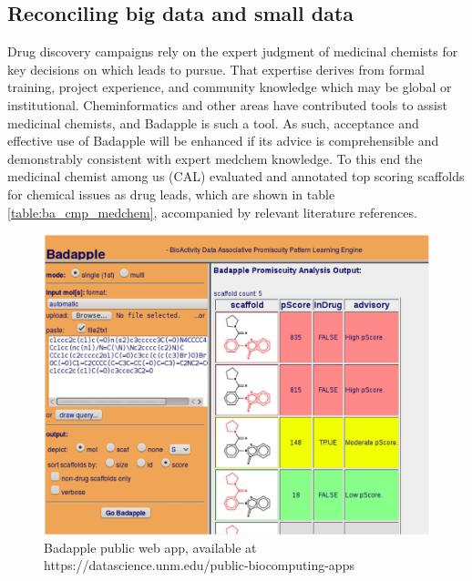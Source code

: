 \subsection{Reconciling big data and small data}

Drug discovery campaigns rely on the expert judgment of medicinal chemists for key decisions on which leads to pursue. That expertise derives from formal training, project experience, and community knowledge which may be global or institutional. Cheminformatics and other areas have contributed tools to assist medicinal chemists, and Badapple is such a tool. As such, acceptance and effective use of Badapple will be enhanced if its advice is comprehensible and demonstrably consistent with expert medchem knowledge. To this end the medicinal chemist among us (CAL) evaluated and annotated top scoring scaffolds for chemical issues as drug leads, which are shown in table \ref{table:ba_cmp_medchem}, accompanied by relevant literature references\cite{Huth2007-kc,Sutter1982-qu,Oda2008-at}.

\begin{figure}
	\includegraphics[width=\textwidth]{figures/badapple/Badapple_Fig6.png}
	\caption{Badapple public web app, available at https://datascience.unm.edu/public-biocomputing-apps}
	\label{fig:BA_06}
\end{figure}



